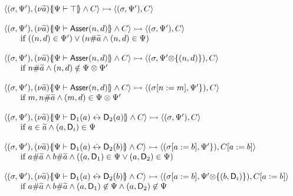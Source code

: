\documentclass[11pt,a4paper]{article}
\theoremstyle{definition}
\begin{document}
\begin{figure}[t!]
\[
\begin{array}{l}
\langle (\sigma, \Psi'), (\nu\ve{a})\constr{\Psi\vdash \top} \land C \rangle
\rightarrowtail
\langle (\sigma, \Psi'), C \rangle 
\\ \\
\langle (\sigma, \Psi'), (\nu\ve{a})\constr{\Psi\vdash \mathsf{Asser}(n,d)} \land C \rangle
\rightarrowtail
\langle (\sigma, \Psi'), C \rangle \\
\qquad \text{if } ((n,d)\in\Psi') \lor (n\freshin\ve{a} \land (n,d) \in \Psi)
\\ \\
\langle (\sigma, \Psi'), (\nu\ve{a})\constr{\Psi\vdash \mathsf{Asser}(n,d)} \land C \rangle
\rightarrowtail
\langle (\sigma, \Psi' \ftimes \{(n,d)\}), C \rangle \\
\qquad \text{if } n\freshin\ve{a} \land (n,d) \notin \Psi\otimes\Psi'
\\ \\
\langle (\sigma, \Psi'), (\nu\ve{a})\constr{\Psi\vdash \mathsf{Asser}(n,d)} \land C \rangle
\rightarrowtail
\langle (\sigma[n:=m], \Psi' \}), C \rangle \\
\qquad \text{if } m,n\freshin\ve{a} \land (m,d) \in \Psi\otimes\Psi'
\\ \\
\langle (\sigma, \Psi'), (\nu\ve{a})\constr{\Psi\vdash \mathsf{D}_1(a) \sch \mathsf{D}_2(a)} \land C \rangle
\rightarrowtail
\langle (\sigma, \Psi') , C \rangle \\
\qquad\text{if } a\in\ve{a}\land (a,\mathsf{D}_i)\in\Psi%
\\ \\
\langle (\sigma, \Psi'), (\nu\ve{a})\constr{\Psi\vdash \mathsf{D}_1(a) \sch \mathsf{D}_2(b)} \land C \rangle
\rightarrowtail
\langle (\sigma[a:=b], \Psi'\}), C[a:=b] \rangle \\
\qquad \text{if } a\freshin\ve{a}  \land b\freshin \ve{a} \land
((a,\mathsf{D}_1)\in\Psi \lor (a,\mathsf{D}_2)\in\Psi)
\\ \\
\langle (\sigma, \Psi'), (\nu\ve{a})\constr{\Psi\vdash \mathsf{D}_1(a) \sch \mathsf{D}_2(b)} \land C \rangle
\rightarrowtail
\langle (\sigma[a:=b], \Psi' \ftimes \{(b,\mathsf{D}_i)\}), C[a:=b] \rangle \\
\qquad \text{if } a\freshin\ve{a}  \land b\freshin \ve{a} \land
(a,\mathsf{D}_1)\not\in\Psi \land (a,\mathsf{D}_2)\not\in\Psi
\\ \\

\end{array}\]
\end{figure}
\end{document}
